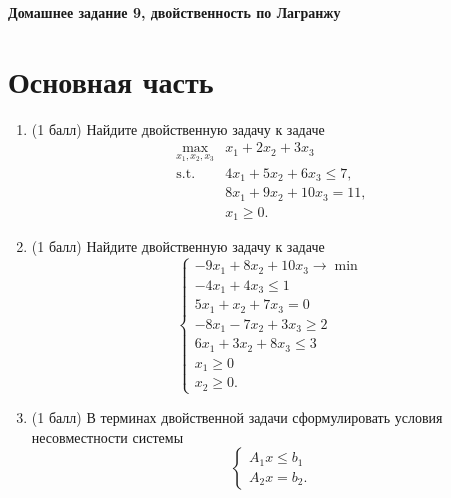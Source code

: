 \begin{center}
    \textbf{Домашнее задание 9, двойственность по Лагранжу}
\end{center}

\section*{Основная часть}

\begin{enumerate}[label=\textbf{Задача \arabic*.}]

    \item (1 балл) Найдите двойственную задачу к задаче
    \begin{equation*}
        \begin{aligned}
            \max_{x_1, x_2, x_3} & x_1 + 2x_2 + 3x_3 \\
            \text{s.t.} \quad & 4x_1 + 5x_2 + 6x_3 \leq 7, \\
                              & 8x_1 + 9x_2 + 10x_3 = 11, \\
                              & x_1 \geq 0.
        \end{aligned}
    \end{equation*}

    \item (1 балл) Найдите двойственную задачу к задаче
    \begin{equation*}
        \begin{cases}
            -9x_1 + 8x_2+10x_3 \rightarrow \min \\
            -4x_1 + 4x_3 \leq 1 \\
            5x_1 + x_2 + 7x_3 = 0 \\
            -8x_1 - 7x_2 + 3x_3 \geq 2 \\
            6x_1 + 3x_2 + 8x_3 \leq 3 \\
            x_1 \geq 0 \\
            x_2 \geq 0.
        \end{cases}
    \end{equation*}

    \item (1 балл) В терминах двойственной задачи сформулировать условия несовместности системы
    \begin{equation*}
        \begin{cases}
            A_1 x \leq b_1 \\
            A_2 x = b_2.
        \end{cases}
    \end{equation*}
    

\end{enumerate}
